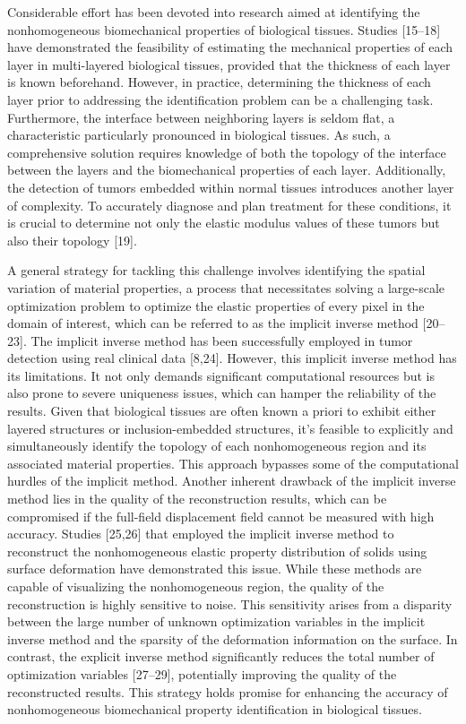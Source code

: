 \documentclass[11pt]{article}
\begin{document}
Considerable effort has been devoted into research aimed at
identifying the nonhomogeneous biomechanical properties of biological
tissues. Studies [15--18] have demonstrated the feasibility of
estimating the mechanical properties of each layer in multi-layered
biological tissues, provided that the thickness of each layer is known
beforehand. However, in practice, determining the thickness of each
layer prior to addressing the identification problem can be a
challenging task. Furthermore, the interface between neighboring
layers is seldom flat, a characteristic particularly pronounced in
biological tissues. As such, a comprehensive solution requires
knowledge of both the topology of the interface between the layers
and the biomechanical properties of each layer. Additionally, the
detection of tumors embedded within normal tissues introduces another
layer of complexity. To accurately diagnose and plan treatment for
these conditions, it is crucial to determine not only the elastic
modulus values of these tumors but also their topology [19].

A general strategy for tackling this challenge involves identifying
the spatial variation of material properties, a process that
necessitates solving a large-scale optimization problem to optimize
the elastic properties of every pixel in the domain of interest,
which can be referred to as the implicit inverse method [20--23]. The
implicit inverse method has been successfully employed in tumor
detection using real clinical data [8,24]. However, this implicit
inverse method has its limitations. It not only demands significant
computational resources but is also prone to severe uniqueness
issues, which can hamper the reliability of the results. Given that
biological tissues are often known a priori to exhibit either layered
structures or inclusion-embedded structures, it's feasible to
explicitly and simultaneously identify the topology of each
nonhomogeneous region and its associated material properties. This
approach bypasses some of the computational hurdles of the implicit
method. Another inherent drawback of the implicit inverse method lies
in the quality of the reconstruction results, which can be
compromised if the full-field displacement field cannot be measured
with high accuracy. Studies [25,26] that employed the implicit
inverse method to reconstruct the nonhomogeneous elastic property
distribution of solids using surface deformation have demonstrated
this issue. While these methods are capable of visualizing the
nonhomogeneous region, the quality of the reconstruction is highly
sensitive to noise. This sensitivity arises from a disparity between
the large number of unknown optimization variables in the implicit
inverse method and the sparsity of the deformation information on the
surface. In contrast, the explicit inverse method significantly
reduces the total number of optimization variables [27--29],
potentially improving the quality of the reconstructed results. This
strategy holds promise for enhancing the accuracy of nonhomogeneous
biomechanical property identification in biological tissues.
\end{document}

